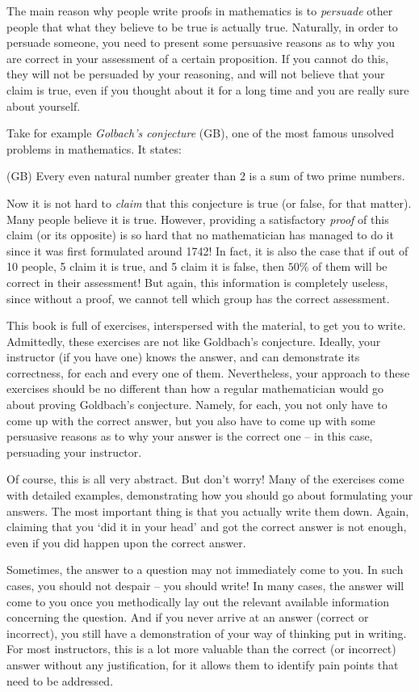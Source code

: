 The main reason why people write proofs in mathematics is to \textit{persuade} other people that what they believe to be true is actually true. Naturally, in order to persuade someone, you need to present some persuasive reasons as to why you are correct in your assessment of a certain proposition. If you cannot do this, they will not be persuaded by your reasoning, and will not believe that your claim is true, even if you thought about it for a long time and you are really sure about yourself. 

Take for example \textit{Golbach's conjecture} (GB), one of the most famous unsolved problems in mathematics. It states: 
\begin{center}
(GB) Every even natural number greater than $2$ is a sum of two prime numbers. 
\end{center}
Now it is not hard to \textit{claim} that this conjecture is true (or false, for that matter). Many people believe it is true. However, providing a satisfactory \textit{proof} of this claim (or its opposite) is so hard that no mathematician has managed to do it since it was first formulated around 1742! In fact, it is also the case that if out of 10 people, 5 claim it is true, and 5 claim it is false, then $50\%$ of them will be correct in their assessment! But again, this information is completely useless, since without a proof, we cannot tell which group has the correct assessment.

This book is full of exercises, interspersed with the material, to get you to write. Admittedly, these exercises are not like Goldbach's conjecture. Ideally, your instructor (if you have one) knows the answer, and can demonstrate its correctness, for each and every one of them. Nevertheless, your approach to these exercises should be no different than how a regular mathematician would go about proving Goldbach's conjecture. Namely, for each, you not only have to come up with the correct answer, but you also have to come up with some persuasive reasons as to why your answer is the correct one -- in this case, persuading your instructor. 

Of course, this is all very abstract. But don't worry! Many of the exercises come with detailed examples, demonstrating how you should go about formulating your answers. The most important thing is that you actually write them down. Again, claiming that you `did it in your head' and got the correct answer is not enough, even if you did happen upon the correct answer. 

Sometimes, the answer to a question may not immediately come to you. In such cases, you should not despair -- you should write! In many cases, the answer will come to you once you methodically lay out the relevant available information concerning the question. And if you never arrive at an answer (correct or incorrect), you still have a demonstration of your way of thinking put in writing. For most instructors, this is a lot more valuable than the correct (or incorrect) answer without any justification, for it allows them to identify pain points that need to be addressed. 

